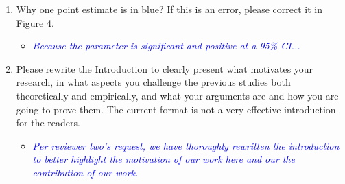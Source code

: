 \begin{enumerate}
\begin{itemize}
	\end{itemize}
	\item Why one point estimate is in blue? If this is an error, please correct it in Figure 4.	
	\begin{itemize}
		\item \textcolor{blue}{ \emph{ Because the parameter is significant and positive at a 95\% CI... }}
	\end{itemize}
	\item Please rewrite the Introduction to clearly present what motivates your research, in what aspects you challenge the previous studies both theoretically and empirically, and what your arguments are and how you are going to prove them. The current format is not a very effective introduction for the readers.
	\begin{itemize}
		\item \textcolor{blue}{ \emph{
		Per reviewer two's request, we have thoroughly rewritten the introduction to better highlight the motivation of our work here and our the contribution of our work.
		}}
	\end{itemize}	
\end{enumerate}
